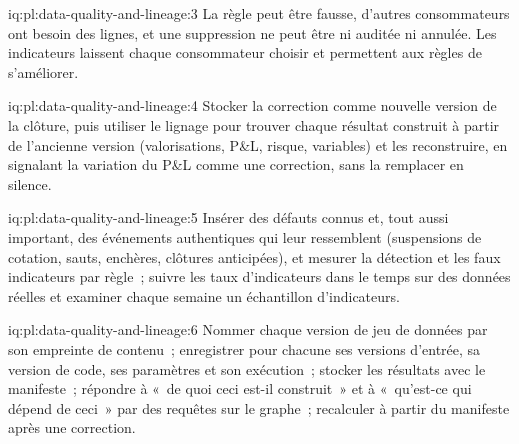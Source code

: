 \begin{solution}{iq:pl:data-quality-and-lineage:3}
La règle peut être fausse, d'autres consommateurs ont besoin des lignes, et une suppression ne peut être ni auditée ni annulée. Les indicateurs laissent chaque consommateur choisir et
permettent aux règles de s'améliorer.
\end{solution}

\begin{solution}{iq:pl:data-quality-and-lineage:4}
Stocker la correction comme nouvelle version de la clôture, puis utiliser le lignage pour trouver chaque résultat construit à partir de l'ancienne version (valorisations, P\&L,
risque, variables) et les reconstruire, en signalant la variation du P\&L comme une correction, sans la remplacer en silence.
\end{solution}

\begin{solution}{iq:pl:data-quality-and-lineage:5}
Insérer des défauts connus et, tout aussi important, des événements authentiques qui leur ressemblent (suspensions de cotation, sauts, enchères, clôtures anticipées), et mesurer la détection
et les faux indicateurs par règle~; suivre les taux d'indicateurs dans le temps sur des données réelles et examiner chaque semaine un échantillon d'indicateurs.
\end{solution}

\begin{solution}{iq:pl:data-quality-and-lineage:6}
Nommer chaque version de jeu de données par son empreinte de contenu~; enregistrer pour chacune ses versions d'entrée, sa version de code, ses paramètres et son exécution~; stocker les résultats avec
le manifeste~; répondre à «~de quoi ceci est-il construit~» et à «~qu'est-ce qui dépend de ceci~» par des requêtes sur le graphe~; recalculer à partir du manifeste après une
correction.
\end{solution}
